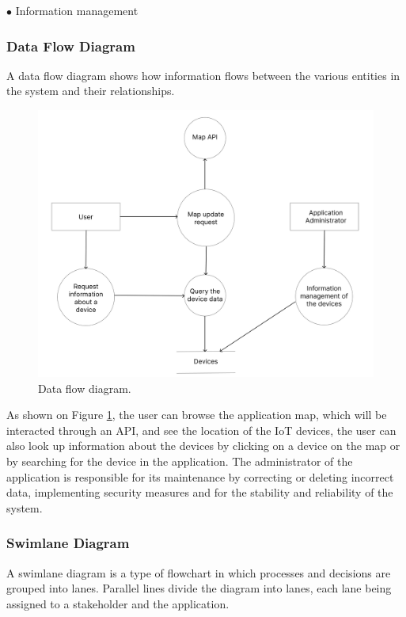 $\bullet$ Information management

\subsubsection{Data Flow Diagram}

A data flow diagram shows how information flows between the various entities
in the system and their relationships.

\begin{figure}[H]
    \centering
    \includegraphics[width=15cm]{../app/docs/software_requirements/assets/images/data_flow_diagram.png}
    \caption{Data flow diagram.}
    \label{fig:data flow diagram}
\end{figure}

As shown on Figure \ref{fig:data flow diagram}, the user can browse the application
map, which will be interacted through an API,
and see the location of the IoT devices, the user can also look up information
about the devices by clicking on a device on the map or by searching for
the device in the application. The administrator of the application is responsible for
its maintenance by correcting or deleting incorrect data, implementing security
measures and for the stability and reliability of the system.

\subsubsection{Swimlane Diagram}

A swimlane diagram is a type of flowchart in which processes and decisions
are grouped into lanes. Parallel lines divide the diagram into lanes, each
lane being assigned to a stakeholder and the application.

